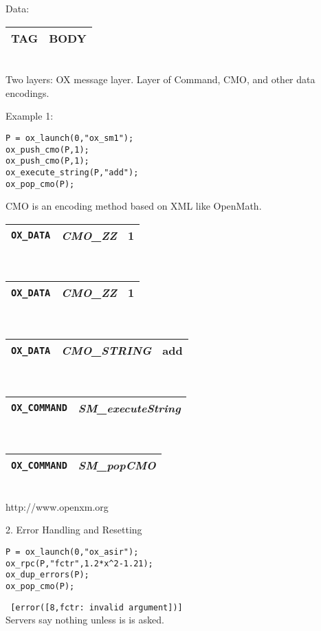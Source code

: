 \documentclass{slides}
\newcommand{\htmladdnormallink}[2]{#1}
\begin{document}
\noindent
{\color{green} Data}: \\
\begin{tabular}{|c|c|}
\hline
{\color{red} TAG}& {\color{blue} BODY} \\ 
\hline
\end{tabular} \\
Two layers: {\color{green} OX message} layer. 
Layer of Command, CMO, and other data encodings.

\noindent
{\color{blue} Example 1}: \\
\begin{verbatim}
P = ox_launch(0,"ox_sm1");
ox_push_cmo(P,1);
ox_push_cmo(P,1);
ox_execute_string(P,"add");
ox_pop_cmo(P);
\end{verbatim}

{\color{green} CMO} is an encoding method based on XML like OpenMath.

\begin{tabular}{|c|c|c|}
\hline
{\tt OX\_DATA} & {\it CMO\_ZZ} & 1 \\ 
\hline
\end{tabular} \\
\begin{tabular}{|c|c|c|}
\hline
{\tt OX\_DATA} & {\it CMO\_ZZ} & 1 \\ 
\hline
\end{tabular} \\
\begin{tabular}{|c|c|c|}
\hline
{\tt OX\_DATA} & {\it CMO\_STRING} & add \\ 
\hline
\end{tabular} \\
\begin{tabular}{|c|c|}
\hline
{\tt OX\_COMMAND} & {\it SM\_executeString} \\ 
\hline
\end{tabular} \\
\begin{tabular}{|c|c|}
\hline
{\tt OX\_COMMAND} & {\it SM\_popCMO} \\ 
\hline
\end{tabular} \\
\htmladdnormallink{http://www.openxm.org}{http://www.openxm.org}
\newpage

\noindent
{\color{red} 2. Error Handling and Resetting} \\
\begin{verbatim}
P = ox_launch(0,"ox_asir");
ox_rpc(P,"fctr",1.2*x^2-1.21);
ox_dup_errors(P);
ox_pop_cmo(P);
\end{verbatim}
{\color{green}
\verb# [error([8,fctr: invalid argument])] #
}\\
{\color{blue}
Servers say nothing unless is is asked.
}
\newpage
\end{document}
